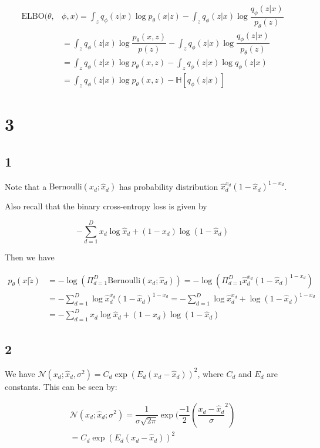 \documentclass{article}
\begin{document}
\begin{align}
\text{ELBO}(\theta, &\phi, x) 
= \int_{z} q_\phi(z|x) \log p_\theta(x|z) - \int_z q_\phi(z|x) \log \dfrac{q_\phi(z|x)}{p_\theta(z)} \\
&= \int_{z} q_\phi(z|x) \log \dfrac{p_\theta(x,z)}{p(z)} - \int_z q_\phi(z|x) \log \dfrac{q_\phi(z|x)}{p_\theta(z)} \\
&= \int_{z} q_\phi(z|x) \log p_\theta(x,z) - \int_z q_\phi(z|x) \log q_\phi(z|x) \\
&= \int_{z} q_\phi(z|x) \log p_\theta(x,z) - \mathbb{H}[q_\phi(z|x)]
\end{align}

\section{3}
\subsection{1}
 Note that a $\text{Bernoulli}(x_d ; \hat{x}_d)$ has probability distribution $\hat{x}_d^{x_d}(1 - \hat{x}_d)^{1 - x_d}$.
 
 Also recall that the binary cross-entropy loss is given by 
 
 $$-\sum_{d=1}^D x_d \log \hat{x}_d + (1 - x_d) \log (1 - \hat{x}_d)$$
 
 Then we have
 
 \begin{align}
     p_\theta(x|\tilde{z}) &= -\log(\Pi_{d=1}^D \text{Bernoulli}(x_d; \hat{x}_d))  
     = -\log(\Pi_{d=1}^D \hat{x}_d^{x_d}(1 - \hat{x}_d)^{1 - x_d})   \\
     &= -\sum_{d=1}^D \log \hat{x}_d^{x_d}(1 - \hat{x}_d)^{1 - x_d}
     = -\sum_{d=1}^D \log \hat{x}_d^{x_d} + \log (1 - \hat{x}_d)^{1 - x_d} \\ 
     &= -\sum_{d=1}^D x_d \log \hat{x}_d + (1 - x_d) \log (1 - \hat{x}_d) 
 \end{align}

\subsection{2}
We have $\mathcal{N}(x_d;\hat{x}_d, \sigma^2) = C_d \exp(E_d(x_d - \hat{x}_d))^2$, where $C_d$ and $E_d$ are constants. This can be seen by:

\begin{align}
    \mathcal{N}(x_d;\hat{x}_d; \sigma^2) 
    = \dfrac{1}{\sigma \sqrt{2\pi}} \exp(\dfrac{-1}{2}(\dfrac{x_d - \hat{x}_d}{\sigma}^2) \\
    = C_d \exp(E_d (x_d - \hat{x}_d))^2
\end{align}
\end{document}
